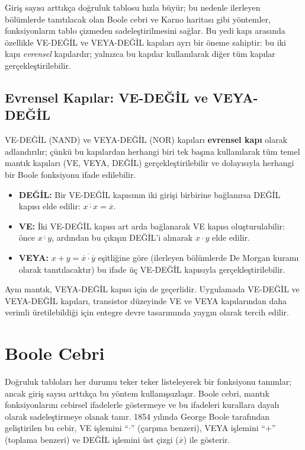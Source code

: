 Giriş sayısı arttıkça doğruluk tablosu hızla büyür; bu nedenle ilerleyen bölümlerde tanıtılacak olan Boole cebri ve Karno haritası gibi yöntemler, fonksiyonların tablo çizmeden sadeleştirilmesini sağlar. Bu yedi kapı arasında özellikle VE-DEĞİL ve VEYA-DEĞİL kapıları ayrı bir öneme sahiptir: bu iki kapı \emph{evrensel} kapılardır; yalnızca bu kapılar kullanılarak diğer tüm kapılar gerçekleştirilebilir.

\subsection{Evrensel Kapılar: VE-DEĞİL ve VEYA-DEĞİL}

VE-DEĞİL (NAND) ve VEYA-DEĞİL (NOR) kapıları \textbf{evrensel kapı} olarak adlandırılır; çünkü bu kapılardan herhangi biri tek başına kullanılarak tüm temel mantık kapıları (VE, VEYA, DEĞİL) gerçekleştirilebilir ve dolayısıyla herhangi bir Boole fonksiyonu ifade edilebilir.

\begin{itemize}[nosep]
    \item \textbf{DEĞİL:} Bir VE-DEĞİL kapısının iki girişi birbirine bağlanırsa DEĞİL kapısı elde edilir: $\overline{x \cdot x} = \overline{x}$.
    \item \textbf{VE:} İki VE-DEĞİL kapısı art arda bağlanarak VE kapısı oluşturulabilir: önce $\overline{x \cdot y}$, ardından bu çıkışın DEĞİL'i alınarak $x \cdot y$ elde edilir.
    \item \textbf{VEYA:} $x + y = \overline{\overline{x} \cdot \overline{y}}$ eşitliğine göre (ilerleyen bölümlerde De Morgan kuramı olarak tanıtılacaktır) bu ifade üç VE-DEĞİL kapısıyla gerçekleştirilebilir.
\end{itemize}

Aynı mantık, VEYA-DEĞİL kapısı için de geçerlidir. Uygulamada VE-DEĞİL ve VEYA-DEĞİL kapıları, transistor düzeyinde VE ve VEYA kapılarından daha verimli üretilebildiği için entegre devre tasarımında yaygın olarak tercih edilir.


\section{Boole Cebri}

Doğruluk tabloları her durumu teker teker listeleyerek bir fonksiyonu tanımlar; ancak giriş sayısı arttıkça bu yöntem kullanışsızlaşır. Boole cebri, mantık fonksiyonlarını cebirsel ifadelerle göstermeye ve bu ifadeleri kurallara dayalı olarak sadeleştirmeye olanak tanır. 1854 yılında George Boole tarafından geliştirilen bu cebir, VE işlemini ``$\cdot$'' (çarpma benzeri), VEYA işlemini ``$+$'' (toplama benzeri) ve DEĞİL işlemini üst çizgi ($\overline{x}$) ile gösterir.

